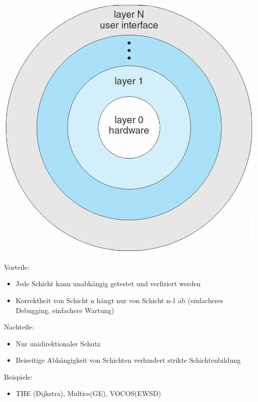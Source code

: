 \documentclass[a4paper]{scrreprt}
\begin{document}
\begin{center}
\includegraphics[scale=0.15] {schichtenmodell.png} 
\end{center}

Vorteile:
	\begin{itemize}
		\item Jede Schicht kann unabhängig getestet und verfiziert werden
		\item Korrektheit von Schicht n hängt nur von Schicht n-1 ab (einfacheres Debugging, einfachere Wartung)
	\end{itemize}

Nachteile:
	\begin{itemize}
		\item Nur unidirektionaler Schutz
		\item Beiseitige Abhängigkeit von Schichten verhindert strikte Schichtenbildung
	\end{itemize}
Beispiele:
	\begin{itemize}
		\item THE (Dijkstra), Multics(GE), VOCOS(EWSD)
	\end{itemize}
	
\end{document}
